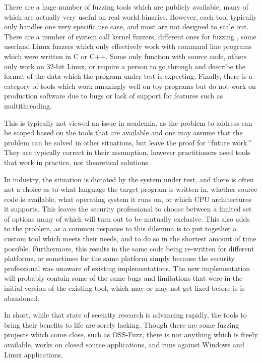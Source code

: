 There are a huge number of fuzzing tools which are publicly available, many of
which are actually very useful on real world binaries.  However, each tool
typically only handles one very specific use case, and most are not designed to scale
out.  There are a number of system call kernel fuzzers, different ones for
fuzzing \IOCTLs{}, some userland Linux fuzzers which only effectively work with
command line programs which were written in C or C++.  Some only function with
source code, others only work on 32-bit Linux, or require a person to go
through and describe the format of the data which the program under test is
expecting.  Finally, there is a category of tools which work amazingly well
on toy programs but do not work on production software due to bugs or lack of
support for features such as multithreading.

This is typically not viewed an issue in academia, as the problem to address can be
scoped based on the tools that are available and one may assume that the problem can
be solved in other situations, but leave the proof for ``future work.''  They
are typically correct in their assumption, however practitioners need tools
that work in practice, not theoretical solutions.

In industry, the situation is dictated by the system under test,
and there is often not a choice as to what language the target program is
written in, whether source code is available, what operating system it runs
on, or which CPU architectures it supports. This leaves the security
professional to choose between a limited set of options many of which will
turn out to be mutually exclusive. This also adds to the problem, as a common
response to this dilemma is to put together a custom tool which meets their
needs, and to do so in the shortest amount of time possible.  Furthermore,
this results in the same code being re-written for different platforms, or
sometimes for the same platform simply because the security professional was
unaware of existing implementations.  The new implementation will probably
contain some of the same bugs and limitations that were in the initial
version of the existing tool, which may or may not get fixed before is is
abandoned.

In short, while that state of security research is advancing rapidly, the
tools to bring their benefits to life are sorely lacking.  Though there are some
fuzzing projects which come close, such as OSS-Fuzz,\cite{ossfuzz} there
is not anything which is freely available, works on closed source applications,
and runs against Windows and Linux applications.
